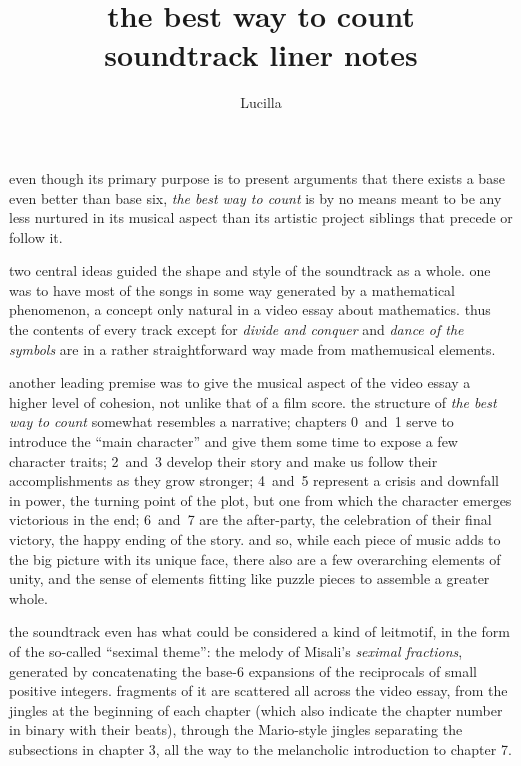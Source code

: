 \documentclass[a4paper, 12pt]{report}
\title{\Huge the best way to count \\ \bigskip \Large soundtrack liner notes}
\author{Lucilla}
\date{}
\begin{document}
\vfill \maketitle \vfill \newpage


even though its primary purpose is to present arguments that there exists a base even better than base six, {\it the best way to count} is by no means meant to be any less nurtured in its musical aspect than its artistic project siblings that precede or follow it.

two central ideas guided the shape and style of the soundtrack as a whole. one was to have most of the songs in some way generated by a mathematical phenomenon, a concept only natural in a video essay about mathematics. thus the contents of every track except for {\it divide and conquer} and {\it dance of the symbols} are in a rather straightforward way made from mathemusical elements.

another leading premise was to give the musical aspect of the video essay a higher level of cohesion, not unlike that of a film score. the structure of {\it the best way to count} somewhat resembles a narrative; chapters 0~and~1 serve to introduce the ``main character'' and give them some time to expose a few character traits; 2~and~3 develop their story and make us follow their accomplishments as they grow stronger; 4~and~5 represent a crisis and downfall in power, the turning point of the plot, but one from which the character emerges victorious in the end; 6~and~7 are the after-party, the celebration of their final victory, the happy ending of the story. and so, while each piece of music adds to the big picture with its unique face, there also are a few overarching elements of unity, and the sense of elements fitting like puzzle pieces to assemble a greater whole.

the soundtrack even has what could be considered a kind of leitmotif, in the form of the so-called ``seximal theme'': the melody of Misali's {\it seximal fractions}, generated by concatenating the base-6 expansions of the reciprocals of small positive integers. fragments of it are scattered all across the video essay, from the jingles at the beginning of each chapter (which also indicate the chapter number in binary with their beats), through the Mario-style jingles separating the subsections in chapter 3, all the way to the melancholic introduction to chapter 7.
\end{document}

